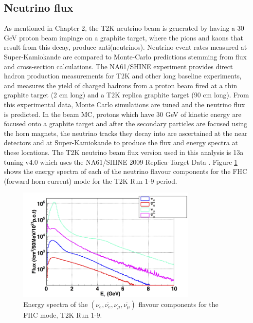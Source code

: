 \subsection{Neutrino flux}
As mentioned in Chapter 2, the T2K neutrino beam is generated by having a 30 GeV proton beam impinge on a graphite target, where the pions and kaons that result from this decay, produce anti(neutrinos). Neutrino event rates measured at Super-Kamiokande are compared to Monte-Carlo predictions stemming from flux and cross-section calculations. The NA61/SHINE experiment provides direct hadron production measurements for T2K and other long baseline experiments, and measures the yield of charged hadrons from a proton beam fired at a thin graphite target (2 cm long) and a T2K replica graphite target (90 cm long). From this experimental data, Monte Carlo simulations are tuned and the neutrino flux is predicted. In the beam MC, protons which have 30 GeV of kinetic energy are focused onto a graphite target and after the secondary particles are focused using the horn magnets, the neutrino tracks they decay into are ascertained at the near detectors and at Super-Kamiokande to produce the flux and energy spectra at these locations. The T2K neutrino beam flux version used in this analysis is 13a tuning v4.0 which uses the NA61/SHINE 2009 Replica-Target Data \cite{flux_ver}. Figure \ref{fig:energy_spectra} shows the energy spectra of each of the neutrino flavour components for the FHC (forward horn current) mode for the T2K Run 1-9 period. 
 
\begin{figure}
    \includegraphics[width=0.8\textwidth]{Figures/energy_spectra.png}
    \caption{Energy spectra of the  $\left(\nu_{e}, \overline{\nu_{e}}, \nu_{\mu}, \overline{\nu_{\mu}}\right)$ flavour components for the FHC mode, T2K Run 1-9. }
\label{fig:energy_spectra}
\end{figure}
 
